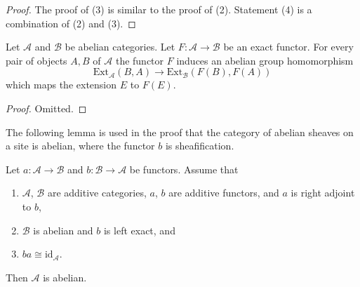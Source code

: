 \begin{proof}
\medskip\noindent
The proof of (3) is similar to the proof of (2).
Statement (4) is a combination of (2) and (3).
\end{proof}

\begin{lemma}
\label{lemma-exact-functor-ext}
Let $\mathcal{A}$ and $\mathcal{B}$ be abelian categories.
Let $F : \mathcal{A} \to \mathcal{B}$ be an exact functor.
For every pair of objects $A, B$ of $\mathcal{A}$ the
functor $F$ induces an abelian group homomorphism
$$
\text{Ext}_\mathcal{A}(B, A)
\longrightarrow
\text{Ext}_\mathcal{B}(F(B), F(A))
$$
which maps the extension $E$ to $F(E)$.
\end{lemma}

\begin{proof}
Omitted.
\end{proof}

\noindent
The following lemma is used in the proof that the category of abelian
sheaves on a site is abelian, where the functor $b$ is sheafification.

\begin{lemma}
\label{lemma-adjoint-get-abelian}
Let $a : \mathcal{A} \to \mathcal{B}$ and $b : \mathcal{B} \to \mathcal{A}$
be functors. Assume that
\begin{enumerate}
\item $\mathcal{A}$, $\mathcal{B}$ are additive categories,
$a$, $b$ are additive functors, and $a$ is right adjoint to $b$,
\item $\mathcal{B}$ is abelian and $b$ is left exact, and
\item $ba \cong \text{id}_\mathcal{A}$.
\end{enumerate}
Then $\mathcal{A}$ is abelian.
\end{lemma}

